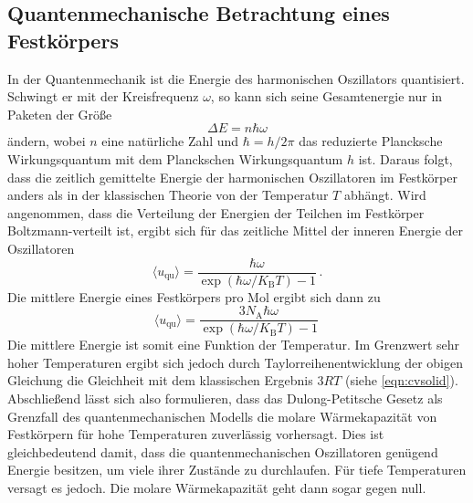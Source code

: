 \subsection{Quantenmechanische Betrachtung eines Festkörpers}
In der Quantenmechanik ist die Energie des harmonischen Oszillators quantisiert.
Schwingt er mit der Kreisfrequenz $\omega$, so kann sich seine Gesamtenergie
nur in Paketen der Größe
\begin{equation}
  \Delta E = n \hbar \omega
  \label{eqn:equantum}
\end{equation}
ändern, wobei $n$ eine natürliche Zahl und $\hbar = h / 2 \pi$ das reduzierte Plancksche
Wirkungsquantum mit dem Planckschen Wirkungsquantum $h$ ist. Daraus folgt, dass
die zeitlich gemittelte Energie der harmonischen Oszillatoren im Festkörper
anders als in der klassischen Theorie von der Temperatur $T$ abhängt. Wird angenommen,
dass die Verteilung der Energien der Teilchen im Festkörper Boltzmann-verteilt ist,
ergibt sich für das zeitliche Mittel der inneren Energie der Oszillatoren
\begin{equation}
  \langle u_\text{qu} \rangle = \frac{\hbar \omega}{\exp(\hbar \omega / K_\text{B} T) - 1}\,.
  \label{eqn:uqu}
\end{equation}
Die mittlere Energie eines Festkörpers pro Mol ergibt sich dann zu
\begin{equation}
  \langle u_\text{qu} \rangle = \frac{3 N_\text{A} \hbar \omega}{\exp(\hbar \omega / K_\text{B} T) - 1}\,
  \label{eqn:uqu}
\end{equation}
Die mittlere Energie ist somit eine Funktion der Temperatur. Im Grenzwert sehr hoher
Temperaturen ergibt sich jedoch durch Taylorreihenentwicklung der obigen Gleichung
die Gleichheit mit dem klassischen Ergebnis $3 R T$ (siehe \eqref{eqn:cvsolid}). \newline
Abschließend lässt sich also formulieren, dass das Dulong-Petitsche Gesetz als Grenzfall
des quantenmechanischen Modells die molare Wärmekapazität von Festkörpern für hohe
Temperaturen zuverlässig vorhersagt. Dies ist gleichbedeutend damit, dass die quantenmechanischen
Oszillatoren genügend Energie besitzen, um viele ihrer Zustände zu durchlaufen.
Für tiefe Temperaturen versagt es jedoch. Die molare Wärmekapazität geht dann sogar gegen
null.
